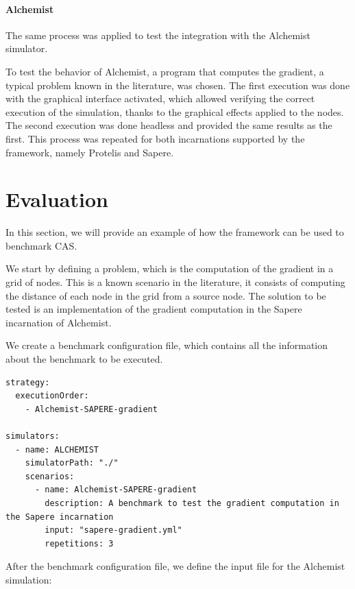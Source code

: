 \documentclass[12pt,a4paper,openright,twoside]{book}
\begin{document}
\paragraph*{Alchemist}
The same process was applied to test the integration with the Alchemist simulator.

To test the behavior of Alchemist, a program that computes the gradient, a typical problem known in the literature, was chosen. 
The first execution was done with the graphical interface activated, which allowed verifying the correct execution of the simulation, thanks to the graphical effects applied to the nodes. 
The second execution was done headless and provided the same results as the first. This process was repeated for both incarnations supported by the framework, namely Protelis and Sapere.

\section{Evaluation}

In this section, we will provide an example of how the framework can be used to benchmark \ac*{CAS}.

We start by defining a problem, which is the computation of the gradient in a grid of nodes.
This is a known scenario in the literature, it consists of computing the distance of each node in the grid from a source node.
The solution to be tested is an implementation of the gradient computation in the Sapere incarnation of Alchemist.

We create a benchmark configuration file, which contains all the information about the benchmark to be executed.

\lstset{style=my-yaml}
\begin{lstlisting}[caption={Case of study: benchmark configuration file}]
strategy:
  executionOrder:
    - Alchemist-SAPERE-gradient

simulators:
  - name: ALCHEMIST
    simulatorPath: "./"
    scenarios:
      - name: Alchemist-SAPERE-gradient
        description: A benchmark to test the gradient computation in the Sapere incarnation
        input: "sapere-gradient.yml"
        repetitions: 3
\end{lstlisting}

After the benchmark configuration file, we define the input file for the Alchemist simulation:
\end{document}
